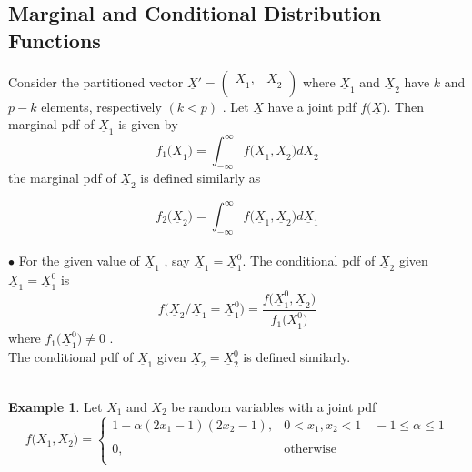 \documentclass[11pt,a4paper]{article}
\theoremstyle{definition}
\newtheorem{exa}[thm]{Example}
\begin{document}
\subsection{Marginal and Conditional Distribution Functions}
Consider the partitioned vector $\underline{X}'=\begin{pmatrix}
\underline{X}_1, & \underline{X}_2\\
\end{pmatrix}$
where $\underline{X}_1$ and $\underline{X}_2$ have $k$ and $p-k$ elements, respectively $(k<p)$ . Let $\underline{X}$ have a joint pdf $f\big(\underline{X}\big)$. Then marginal pdf of $\underline{X}_1$ is given by 
\begin{equation}\tag{4}
f_1\big(\underline{X}_1\big) = \int^{\infty}_{-\infty} f\big(\underline{X}_1,\underline{X}_2\big)d\underline{X}_2
\end{equation}
the marginal pdf of $\underline{X}_2$ is defined similarly as 


$$f_2\big(\underline{X}_2\big) = \int^{\infty}_{-\infty} f\big(\underline{X}_1,\underline{X}_2\big)d\underline{X}_1$$\\




$\bullet$ For the given value of $\underline{X}_1$ , say $\underline{X}_1 = \underline{X}^0_1$. The conditional pdf of $\underline{X}_2$  given $\underline{X}_1 = \underline{X}_1^0$ is \begin{equation}\tag{5}
f\big(\underline{X}_2/\underline{X}_1=\underline{X}_1^0\big) = \frac{f\big(\underline{X}_1^0,\underline{X}_2\big)}{f_1\big(\underline{X}_1^0\big)}
\end{equation}
where $f_1\big(\underline{X}_1^0\big) \neq 0$ .\\

The conditional pdf of $\underline{X}_1$ given $\underline{X}_2 = \underline{X}_2^0$ is defined similarly.\\\\

\begin{exa}
Let $X_1$ and $X_2$ be random variables with a joint pdf  
\[f\big(X_1,X_2\big) =
\begin{cases}
1 + \alpha (2x_1-1)(2x_2-1), & 0<x_1,x_2<1\quad  -1\leq \alpha \leq 1\\\\
0, & \text{otherwise}\\
\end{cases}
\]
\end{exa}
\end{document}
